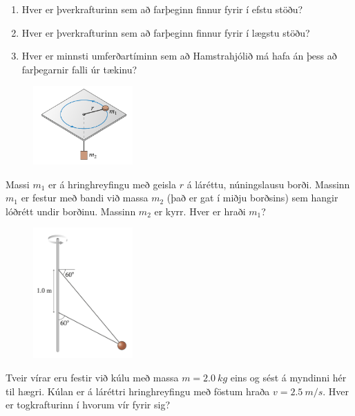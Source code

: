 \ifdefined \wholebook \else\documentclass[oneside]{book}\usepackage{EdlBook}\graphicspath{{figures/}}
\begin{document}
\begin{enumerate}[label = \textbf{Dæmi \thechapter.\arabic*.}]
\begin{minipage}{\linewidth}
\begin{enumerate}[label = \textbf{(\alph*)}]
    \item Hver er þverkrafturinn sem að farþeginn finnur fyrir í efstu stöðu?
    
    \item Hver er þverkrafturinn sem að farþeginn finnur fyrir í lægstu stöðu?
    
    \item Hver er minnsti umferðartíminn sem að Hamstrahjólið má hafa án þess að farþegarnir falli úr tækinu?
\end{enumerate}

\begin{figure}
\vspace{-1.5cm}
\includegraphics[width=1.5in]{images/hringhreyfing3.png}
\end{figure}

\item Massi $m_1$ er á hringhreyfingu með geisla $r$ á láréttu, núningslausu borði. Massinn $m_1$ er festur með bandi við massa $m_2$ (það er gat í miðju borðsins) sem hangir lóðrétt undir borðinu. Massinn $m_2$ er kyrr. Hver er hraði $m_1$?
\end{minipage}

\begin{minipage}{\linewidth}
\begin{figure}
\vspace{-0.5cm}
\includegraphics[width=1.5in]{images/hringhreyfing4.png}
\end{figure}

\item Tveir vírar eru festir við kúlu með massa $m = \SI{2.0}{kg}$ eins og sést á myndinni hér til hægri. Kúlan er á láréttri hringhreyfingu með föstum hraða $v = \SI{2.5}{m/s}$. Hver er togkrafturinn í hvorum vír fyrir sig?


\end{minipage}
\end{enumerate}
\end{document}
